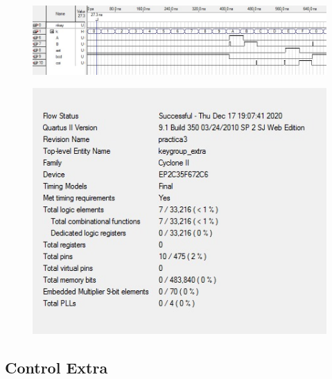 \documentclass[12pt, a4papre]{article}
\begin{document}
			
						\begin{figure}[H]
		\begin{center}
		\includegraphics[width=130mm]{simulacioKeyGroupExtra.jpeg}
		\end{center}
	\end{figure}	
		\begin{figure}[H]
			
				\begin{center}
		\includegraphics[width=130mm]{informeKeyGroupExtra.jpeg}
		\end{center}
	\end{figure}	
			
			
\subsection{Control Extra}
\end{document}
